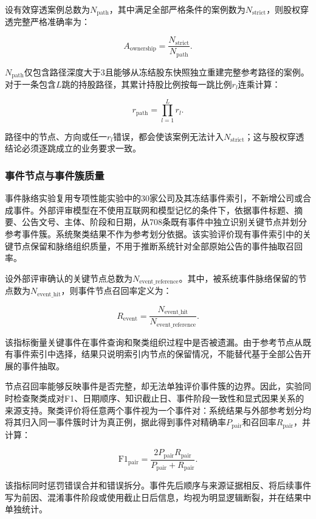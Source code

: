 设有效穿透案例总数为$N_{\mathrm{path}}$，其中满足全部严格条件的案例数为$N_{\mathrm{strict}}$，则股权穿透完整严格准确率为：

\[
A_{\mathrm{ownership}}=\frac{N_{\mathrm{strict}}}{N_{\mathrm{path}}}.
\]

$N_{\mathrm{path}}$仅包含路径深度大于3且能够从冻结股东快照独立重建完整参考路径的案例。对于一条包含$L$跳的持股路径，其累计持股比例按每一跳比例$r_l$连乘计算：

\[
r_{\mathrm{path}}=\prod_{l=1}^{L}r_l.
\]

路径中的节点、方向或任一$r_l$错误，都会使该案例无法计入$N_{\mathrm{strict}}$；这与股权穿透结论必须逐跳成立的业务要求一致。

\subsubsection{事件节点与事件簇质量}

事件脉络实验复用专项性能实验中的30家公司及其冻结事件索引，不新增公司或合成事件。外部评审模型在不使用互联网和模型记忆的条件下，依据事件标题、摘要、公告文号、主体、阶段和日期，从708条既有事件中独立识别关键节点并划分参考事件簇。系统聚类结果不作为参考划分依据。该实验评价现有事件索引中的关键节点保留和脉络组织质量，不用于推断系统针对全部原始公告的事件抽取召回率。

设外部评审确认的关键节点总数为$N_{\mathrm{event\_reference}}$。其中，被系统事件脉络保留的节点数为$N_{\mathrm{event\_hit}}$，则事件节点召回率定义为：

\[
R_{\mathrm{event}}=\frac{N_{\mathrm{event\_hit}}}{N_{\mathrm{event\_reference}}}.
\]

该指标衡量关键事件在事件查询和聚类组织过程中是否被遗漏。由于参考节点从既有事件索引中选择，结果只说明索引内节点的保留情况，不能替代基于全部公告开展的事件抽取。

节点召回率能够反映事件是否完整，却无法单独评价事件簇的边界。因此，实验同时检查聚类成对F1、日期顺序、知识截止日、事件阶段一致性和显式因果关系的来源支持。聚类评价将任意两个事件视为一个事件对：系统结果与外部参考划分均将其归入同一事件簇时计为真正例，据此得到事件对精确率$P_{\mathrm{pair}}$和召回率$R_{\mathrm{pair}}$，并计算：

\[
\mathrm{F1}_{\mathrm{pair}}=\frac{2P_{\mathrm{pair}}R_{\mathrm{pair}}}{P_{\mathrm{pair}}+R_{\mathrm{pair}}}.
\]

该指标同时惩罚错误合并和错误拆分。事件先后顺序与来源证据相反、将后续事件写为前因、混淆事件阶段或使用截止日后信息，均视为明显逻辑断裂，并在结果中单独统计。

